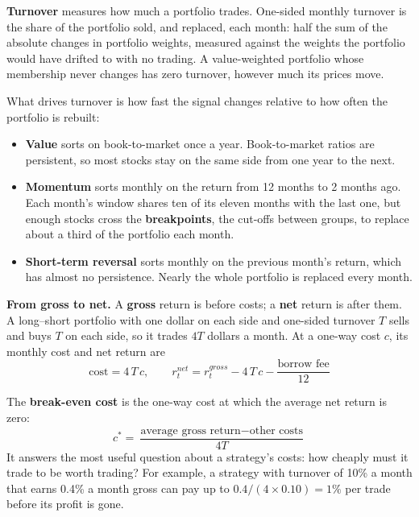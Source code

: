 \textbf{Turnover} measures how much a portfolio trades. One-sided monthly turnover is the share of the portfolio sold, and replaced, each month: half the sum of the absolute changes in portfolio weights, measured against the weights the portfolio would have drifted to with no trading. A value-weighted portfolio whose membership never changes has zero turnover, however much its prices move.

What drives turnover is how fast the signal changes relative to how often the portfolio is rebuilt:

\begin{itemize}
  \item \textbf{Value} sorts on book-to-market once a year. Book-to-market ratios are persistent, so most stocks stay on the same side from one year to the next.
  \item \textbf{Momentum} sorts monthly on the return from 12 months to 2 months ago. Each month's window shares ten of its eleven months with the last one, but enough stocks cross the \textbf{breakpoints}, the cut-offs between groups, to replace about a third of the portfolio each month.
  \item \textbf{Short-term reversal} sorts monthly on the previous month's return, which has almost no persistence. Nearly the whole portfolio is replaced every month.
\end{itemize}

\textbf{From gross to net.} A \textbf{gross} return is before costs; a \textbf{net} return is after them. A long--short portfolio with one dollar on each side and one-sided turnover $T$ sells and buys $T$ on each side, so it trades $4T$ dollars a month. At a one-way cost $c$, its monthly cost and net return are
\begin{equation}
  \text{cost} = 4\,T\,c, \qquad r^{net}_t = r^{gross}_t - 4\,T\,c - \frac{\text{borrow fee}}{12}
  \label{eq:06-net}
\end{equation}

The \textbf{break-even cost} is the one-way cost at which the average net return is zero:
\begin{equation}
  c^* = \frac{\text{average gross return} - \text{other costs}}{4T}
  \label{eq:06-breakeven}
\end{equation}
It answers the most useful question about a strategy's costs: how cheaply must it trade to be worth trading? For example, a strategy with turnover of 10\% a month that earns 0.4\% a month gross can pay up to $0.4/(4 \times 0.10) = 1\%$ per trade before its profit is gone.

